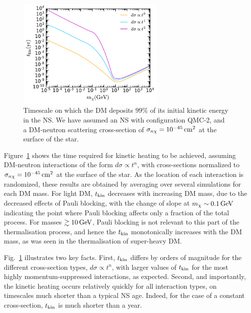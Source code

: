 \begin{figure}[t!bp]
    \centering  
    \includegraphics[width = 0.65\textwidth]{kinheattime_mdm.pdf}
    \caption{Timescale on which the DM deposits $99\%$ of its initial kinetic energy in the NS. We have assumed an NS with configuration QMC-2, and a DM-neutron scattering cross-section of $\sigma_{n\chi}=10^{-45}{\rm \,cm}^2$ at the surface of the star. 
    }
    \label{ch6:fig:kinheattimes}
\end{figure}

Figure~\ref{ch6:fig:kinheattimes} shows the time required for kinetic heating to be achieved, assuming DM-neutron interactions of the form $d\sigma \propto t^n$, with cross-sections normalized to $\sigma_{n\chi} = 10^{-45}{\rm \,cm}^2$ at the surface of the star. As the location of each interaction is randomized, these results are obtained by averaging over several simulations for each DM mass. For light DM, $t_{\rm kin}$ decreases with increasing DM mass, due to the decreased effects of Pauli blocking, with the change of slope at $m_\chi \sim 0.1{\rm \,GeV}$ indicating the point where Pauli blocking affects only a fraction of the total process.
For masses $\gtrsim 10{\rm \,GeV}$, Pauli blocking is not relevant to this part of the thermalisation process, and hence the $t_{\rm kin}$ monotonically increases with the DM mass, as was seen in the thermalisation of super-heavy DM. 

Fig.~\ref{ch6:fig:kinheattimes} illustrates two key facts. First, $t_{\rm kin}$ differs by orders of magnitude for the different cross-section types, $d\sigma\propto t^n$, with larger values of $t_{\rm kin}$ for the most highly momentum-suppressed interactions, as expected. Second, and importantly, the kinetic heating occurs relatively quickly for all interaction types, on timescales much shorter than a typical NS age. Indeed, for the case of a constant cross-section, $t_{\rm kin}$ is much shorter than a year.



